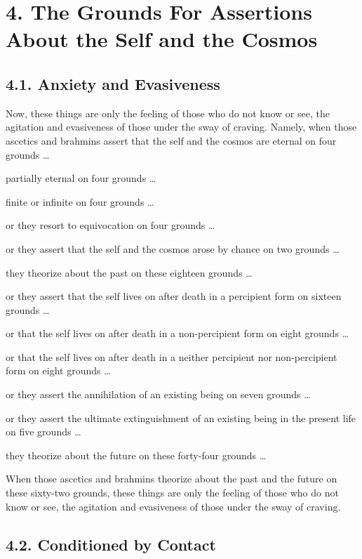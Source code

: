 \documentclass[12pt,openany]{book}%
\begin{document}
\section*{4. The Grounds For Assertions About the Self and the Cosmos }

\subsection*{4.1. Anxiety and Evasiveness }

Now, these things are only the feeling of those who do not know or see, the agitation and evasiveness of those under the sway of craving. Namely, when those ascetics and brahmins assert that the self and the cosmos are eternal on four grounds … 

partially eternal on four grounds … 

finite or infinite on four grounds … 

or they resort to equivocation on four grounds … 

or they assert that the self and the cosmos arose by chance on two grounds … 

they theorize about the past on these eighteen grounds … 

or they assert that the self lives on after death in a percipient form on sixteen grounds … 

or that the self lives on after death in a non-percipient form on eight grounds … 

or that the self lives on after death in a neither percipient nor non-percipient form on eight grounds … 

or they assert the annihilation of an existing being on seven grounds … 

or they assert the ultimate extinguishment of an existing being in the present life on five grounds … 

they theorize about the future on these forty-four grounds … 

When those ascetics and brahmins theorize about the past and the future on these sixty-two grounds, these things are only the feeling of those who do not know or see, the agitation and evasiveness of those under the sway of craving. 

\subsection*{4.2. Conditioned by Contact }
\end{document}

